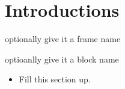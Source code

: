 \section{Introductions}
\begin{frame}{optionally give it a frame name}
	\begin{block}{optioanlly give it a block name}
		\begin{itemize}
			\item Fill this section up.
		\end{itemize}
	\end{block}
\end{frame}
